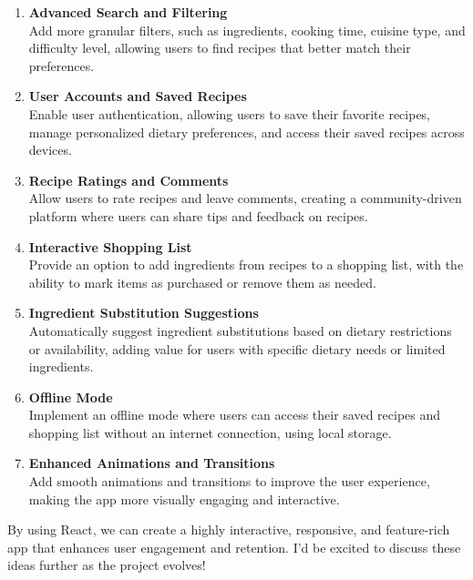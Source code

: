\documentclass{article}
\begin{document}
\begin{enumerate}
    \item \textbf{Advanced Search and Filtering} \\
    Add more granular filters, such as ingredients, cooking time, cuisine type, and difficulty level, allowing users to find recipes that better match their preferences.

    \item \textbf{User Accounts and Saved Recipes} \\
    Enable user authentication, allowing users to save their favorite recipes, manage personalized dietary preferences, and access their saved recipes across devices.

    \item \textbf{Recipe Ratings and Comments} \\
    Allow users to rate recipes and leave comments, creating a community-driven platform where users can share tips and feedback on recipes.

    \item \textbf{Interactive Shopping List} \\
    Provide an option to add ingredients from recipes to a shopping list, with the ability to mark items as purchased or remove them as needed.

    \item \textbf{Ingredient Substitution Suggestions} \\
    Automatically suggest ingredient substitutions based on dietary restrictions or availability, adding value for users with specific dietary needs or limited ingredients.

    \item \textbf{Offline Mode} \\
    Implement an offline mode where users can access their saved recipes and shopping list without an internet connection, using local storage.

    \item \textbf{Enhanced Animations and Transitions} \\
    Add smooth animations and transitions to improve the user experience, making the app more visually engaging and interactive.
\end{enumerate}

By using React, we can create a highly interactive, responsive, and feature-rich app that enhances user engagement and retention. I’d be excited to discuss these ideas further as the project evolves!
\end{document}
